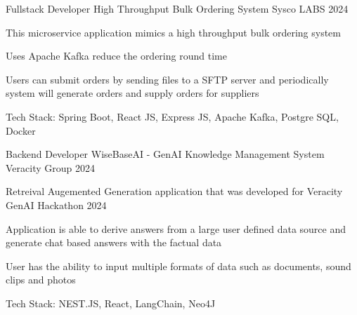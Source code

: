 

\begin{cventries}
    
    
    
    \cventry
    {Fullstack Developer} %
    {High Throughput Bulk Ordering System \href{https://github.com/kulasinghet/}{\faGithubSquare}} %
    {Sysco LABS} %
    {2024} %
    {
        \begin{cvitems} %
            \item {This microservice application mimics a high throughput bulk ordering system}
            \item {Uses Apache Kafka reduce the ordering round time}
            \item {Users can submit orders by sending files to a SFTP server and periodically system will generate orders and supply orders for suppliers}
            \item {Tech Stack: Spring Boot, React JS, Express JS, Apache Kafka, Postgre SQL, Docker}
        \end{cvitems}
    } 



    \cventry
    {Backend Developer} %
    {WiseBaseAI - GenAI Knowledge Management System \href{https://github.com/kulasinghet/}{\faGithubSquare}} %
    {Veracity Group} %
    {2024} %
    {
        \begin{cvitems} %
            \item {Retreival Augemented Generation application that was developed for Veracity GenAI Hackathon 2024}
            \item {Application is able to derive answers from a large user defined data source and generate chat based answers with the factual data}
            \item {User has the ability to input multiple formats of data such as documents, sound clips and photos}
            \item {Tech Stack: NEST.JS, React, LangChain, Neo4J}
        \end{cvitems}
    } 
    

\end{cventries}
